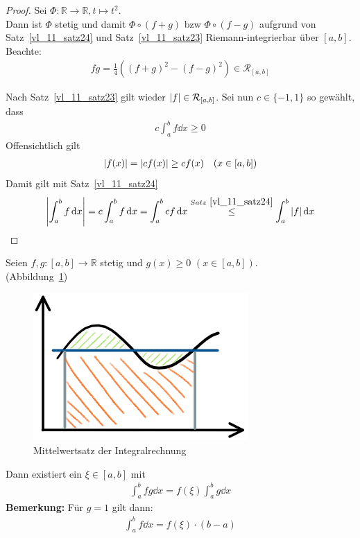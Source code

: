 \begin{proof}
	Sei $\Phi : \mathbb{R} \rightarrow  \mathbb{R}, t \mapsto t^2$. \\
	Dann ist
	$\Phi$ stetig und damit $\Phi \circ (f+g) $ bzw $\Phi \circ (f -g)$ 
	aufgrund von Satz~\ref{vl_11_satz24} und Satz~\ref{vl_11_satz23}
	Riemann-integrierbar über $[a,b]$.
	Beachte: 
	\begin{align*}
		f g = \frac{1}{4} ((f + g)^2 - (f-g)^2) \in \mathcal{R}_{[a,b]}
	\end{align*}
	\item Nach Satz~\ref{vl_11_satz23}
	gilt wieder $\abs{f} \in \mathcal{R}_{[a,b]}$. Sei nun $c \in \{-1, 1\}$ so 
	gewählt, dass 
	\begin{align*}
		c \int_a^b f \dd{x} \geq 0
	\end{align*}
	Offensichtlich gilt 
	\begin{align*}
		\abs{f(x)} = \abs{c f(x)} \geq c f(x) \quad (x \in [a,b])
	\end{align*}
	Damit gilt mit Satz~\ref{vl_11_satz24}
	\begin{align*}
		\abs{\int_a^b f\dd{x}} = c \int_a^b f\dd{x} = \int_a^b cf \dd{x} 
		\overset{Satz~\ref{vl_11_satz24}}{\le} \int_a^b \abs{f}\dd{x}
	\end{align*}
\end{proof}

\begin{Satz}{
	Seien $f,g: [a,b] \rightarrow \mathbb{R}$ stetig und 
	$g(x) \geq 0$ $(x \in[a,b])$. \\
	(Abbildung~\ref{plot_MWS_int}) 
	\begin{figure}
	\begin{center}
		\includegraphics[scale=0.5]{Skizzen/mws_int}
	\end{center}
	\caption{Mittelwertsatz der Integralrechnung}
	\label{plot_MWS_int}
	\end{figure}		
	
	Dann existiert ein $\xi \in [a,b]$ mit 
	\begin{align*}
		\int_a^b f g \dd{x} = f(\xi) \int_a^b g\dd{x}
	\end{align*}
	\textbf{Bemerkung:}
	Für $g = 1$ gilt dann: 
	\begin{align*}
		\int_a^b f \dd{x} = f(\xi) \cdot (b-a)
	\end{align*}
}\end{Satz}


